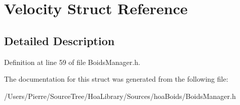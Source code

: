 \hypertarget{struct_velocity}{\section{Velocity Struct Reference}
\label{struct_velocity}
}


\subsection{Detailed Description}


Definition at line 59 of file Boids\-Manager.\-h.



The documentation for this struct was generated from the following file\-:\begin{DoxyCompactItemize}
\item 
/\-Users/\-Pierre/\-Source\-Tree/\-Hoa\-Library/\-Sources/hoa\-Boids/Boids\-Manager.\-h\end{DoxyCompactItemize}

